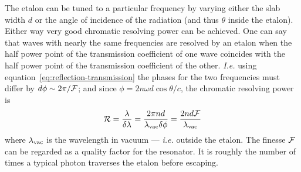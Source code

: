 \documentclass{article}
\def\cl#1{{\cal #1}}               %
\begin{document}
The etalon can be tuned to a particular frequency by varying either the slab width $d$ or the angle of incidence of the radiation (and thus $\theta$ inside the etalon). Either way very good chromatic resolving power can be achieved. One can say that waves with nearly the same frequencies are resolved by an etalon when the half power point of the transmission coefficient of one wave coincides with the half power point of the transmission coefficient of the other. {\it I.e.} using equation~\ref{eq:reflection-transmission} the phases for the two frequencies must differ by $d\phi\sim{2\pi/\cl{F}}$; and since $\phi={2n\omega d\cos\theta/c}$, the chromatic resolving power is 
\[
\cl{R}={\lambda\over\delta\lambda}={2\pi nd\over\lambda_{\rm vac}\delta\phi}
         ={2nd\cl{F}\over\lambda_{\rm vac}}
\]
\noindent
where $\lambda_{\rm vac}$ is the wavelength in vacuum --- {\it i.e.} outside the etalon. The finesse $\cl{F}$ can be regarded as a quality factor for the resonator. It is roughly the number of times a typical photon traverses the etalon before escaping. 
\end{document}
